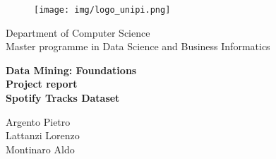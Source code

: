 \begin{titlepage}
\begin{figure}[!htb]
    \centering
    \texttt{[image: img/logo\_unipi.png]}
\end{figure}

\begin{center}
    \vspace{5mm}
 \large{Department of Computer Science}
    \vspace{3mm}
    \\ \LARGE{Master programme in Data Science and Business Informatics}
\end{center}

\vspace{8mm}
\begin{center}
    {\LARGE{\bf Data Mining: Foundations}}\\
    {\Large{\bf Project report}}\\
    \vspace{3mm}
    {\large{\bf Spotify Tracks Dataset}}
\end{center}
\vspace{20mm}

\begin{minipage}[t]{0.47\textwidth}
	{\large{Argento Pietro\\
Lattanzi Lorenzo\\
Montinaro Aldo}}
\end{minipage}

\vspace{30mm}
\hrulefill
\\

\end{titlepage}